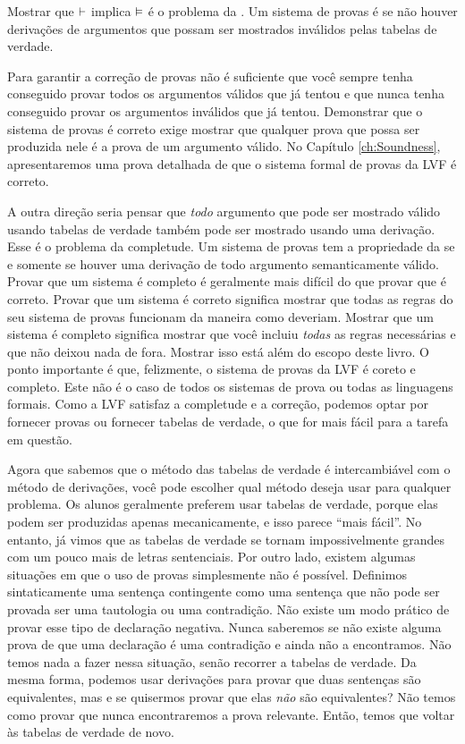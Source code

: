 Mostrar que $\vdash $ implica  $\vDash $  é  o problema da . \label{def:soundness} Um sistema de provas é   se não houver derivações de argumentos que possam ser mostrados inválidos pelas tabelas de verdade. 
 \label{def_Soundness} 

Para garantir a correção de provas não é suficiente que você sempre tenha conseguido provar todos os argumentos válidos que já tentou e que nunca tenha conseguido provar os argumentos inválidos que já tentou. Demonstrar que o sistema de provas é correto exige mostrar que qualquer prova que possa ser produzida nele é a prova de um argumento válido.  No  Capítulo \ref{ch:Soundness}, apresentaremos uma prova detalhada de  que o sistema formal de provas da LVF é correto.  

A outra direção seria pensar que \emph{todo} argumento que pode ser mostrado válido usando tabelas de verdade também pode ser mostrado usando uma derivação.
Esse é o problema da completude. Um sistema de provas tem a propriedade da    \label{def:completeness} se e somente se houver uma derivação de todo argumento semanticamente válido. Provar que um sistema é completo é geralmente mais difícil do que provar que é correto. Provar que um sistema é correto significa mostrar que todas as regras do seu sistema de provas funcionam da maneira como deveriam.
Mostrar que um sistema é completo significa mostrar que você incluiu \emph{todas} as regras necessárias e que não deixou nada de fora. Mostrar isso está além do escopo deste livro. O ponto importante é que, felizmente, o sistema de provas da LVF é coreto e completo. Este não é o caso de todos os sistemas de prova ou todas as linguagens formais. Como a LVF satisfaz a completude e a correção,  podemos optar por fornecer provas ou fornecer tabelas de verdade, o que for mais fácil para a tarefa em questão.

Agora que sabemos que o método das tabelas de verdade é intercambiável com o método de derivações, você pode escolher qual método deseja usar para qualquer problema. Os alunos geralmente preferem usar tabelas de verdade, porque elas podem ser produzidas apenas mecanicamente, e isso parece ``mais fácil''. No entanto, já vimos que as tabelas de verdade se tornam impossivelmente grandes com um pouco mais de letras sentenciais.
Por outro lado, existem algumas situações em que o uso de provas simplesmente não é possível. Definimos sintaticamente uma sentença contingente como uma sentença que não pode ser provada ser uma tautologia ou uma contradição. Não existe um modo prático de provar esse tipo de declaração negativa. Nunca saberemos se não existe alguma prova de que uma declaração é uma contradição e ainda não a encontramos. Não temos nada a fazer nessa situação, senão recorrer a tabelas de verdade. Da mesma forma, podemos usar derivações para provar que duas sentenças são equivalentes, mas e se quisermos provar que elas \emph{não} são equivalentes? Não temos como provar que nunca encontraremos a prova relevante. Então, temos que voltar às tabelas de verdade de novo.

